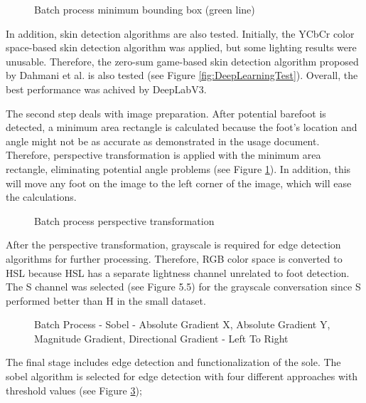 \begin{figure}[htbp]
\centering
{}
\caption{Batch process minimum bounding box (green line)}
\label{fig:BatchProcessMinimumBoundingBox}
\end{figure}

In addition, skin detection algorithms are also tested. Initially, the YCbCr color space-based skin detection algorithm was applied, but some lighting results were unusable. Therefore, the zero-sum game-based skin detection algorithm proposed by Dahmani et al. \cite{dahmani2020zero} is also tested (see Figure \ref{fig:DeepLearningTest}). Overall, the best performance was achived by DeepLabV3. 

The second step deals with image preparation. After  potential barefoot is detected, a minimum area rectangle is calculated because the foot's location and angle might not be as accurate as demonstrated in the usage document. Therefore, perspective transformation is applied with the minimum area rectangle, eliminating potential angle problems (see Figure \ref{fig:BatchProcessMinimumBoundingBox}). In addition, this will move any foot on the image to the left corner of the image, which will ease the calculations.

\begin{figure}[htbp]
\centering
{}
\caption{Batch process perspective transformation}
\label{fig:BatchProcessPerspectiveTransformation}
\end{figure}

After the perspective transformation, grayscale is required for edge detection algorithms for further processing. Therefore, RGB color space is converted to HSL because HSL has a separate lightness channel unrelated to foot detection. The S channel was selected (see Figure 5.5) for the grayscale conversation since S performed better than H in the small dataset.


\begin{figure}[htbp]
\centering
{}
\caption{Batch Process - Sobel - Absolute Gradient X, Absolute Gradient Y, Magnitude Gradient, Directional Gradient - Left To Right}
\label{fig:BatchProcessSobelOutput}
\end{figure}

The final stage includes edge detection and functionalization of the sole. The sobel algorithm is selected for edge detection with four different approaches with threshold values (see Figure \ref{fig:BatchProcessSobelOutput});

